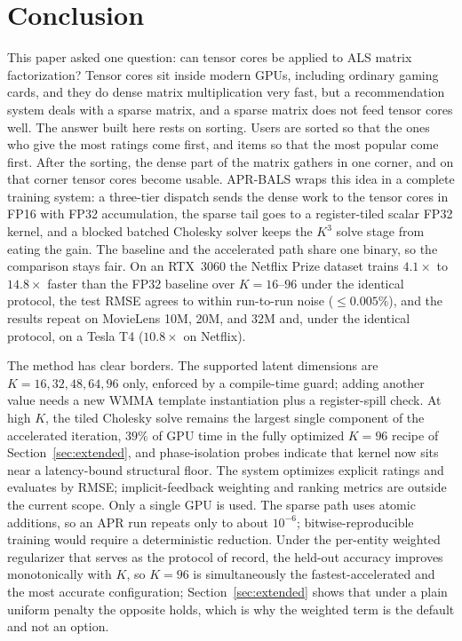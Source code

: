 \section{Conclusion}
\label{sec:conclusion}

This paper asked one question: can tensor cores be applied to ALS matrix factorization? Tensor cores sit inside modern GPUs, including ordinary gaming cards, and they do dense matrix multiplication very fast, but a recommendation system deals with a sparse matrix, and a sparse matrix does not feed tensor cores well. The answer built here rests on sorting. Users are sorted so that the ones who give the most ratings come first, and items so that the most popular come first. After the sorting, the dense part of the matrix gathers in one corner, and on that corner tensor cores become usable. APR-BALS wraps this idea in a complete training system: a three-tier dispatch sends the dense work to the tensor cores in FP16 with FP32 accumulation, the sparse tail goes to a register-tiled scalar FP32 kernel, and a blocked batched Cholesky solver keeps the $K^{3}$ solve stage from eating the gain. The baseline and the accelerated path share one binary, so the comparison stays fair. On an RTX~3060 the Netflix Prize dataset trains $4.1\times$ to $14.8\times$ faster than the FP32 baseline over $K = 16$--$96$ under the identical protocol, the test RMSE agrees to within run-to-run noise ($\le 0.005\%$), and the results repeat on MovieLens 10M, 20M, and 32M and, under the identical protocol, on a Tesla T4 ($10.8\times$ on Netflix).

The method has clear borders. The supported latent dimensions are $K = 16, 32, 48, 64, 96$ only, enforced by a compile-time guard; adding another value needs a new WMMA template instantiation plus a register-spill check. At high $K$, the tiled Cholesky solve remains the largest single component of the accelerated iteration, $39\%$ of GPU time in the fully optimized $K=96$ recipe of Section~\ref{sec:extended}, and phase-isolation probes indicate that kernel now sits near a latency-bound structural floor. The system optimizes explicit ratings and evaluates by RMSE; implicit-feedback weighting and ranking metrics are outside the current scope. Only a single GPU is used. The sparse path uses atomic additions, so an APR run repeats only to about $10^{-6}$; bitwise-reproducible training would require a deterministic reduction. Under the per-entity weighted regularizer that serves as the protocol of record, the held-out accuracy improves monotonically with $K$, so $K=96$ is simultaneously the fastest-accelerated and the most accurate configuration; Section~\ref{sec:extended} shows that under a plain uniform penalty the opposite holds, which is why the weighted term is the default and not an option.

